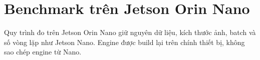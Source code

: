 \section{Benchmark trên Jetson Orin Nano}

Quy trình đo trên Jetson Orin Nano giữ nguyên dữ liệu, kích thước ảnh, batch và
số vòng lặp như Jetson Nano. Engine được build lại trên chính thiết bị, không sao
chép engine từ Nano.

\begin{table}[H]
\centering
\caption{Suy luận YOLO26n trên Jetson Orin Nano (ảnh 640, batch 1)}
\label{tab:orin-inference}
\end{table}
